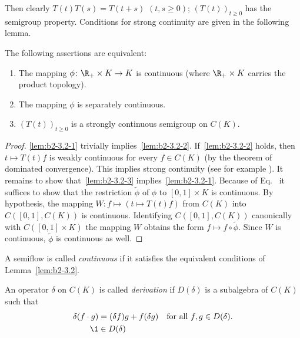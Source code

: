 Then clearly $T(t)T(s) = T(t+s)$ $(t,s\geq 0)$; \ie  $(T(t))_{t \geq 0}$ has the
semigroup property.
Conditions for strong continuity are given in the following lemma.

\begin{lemma}\label{lem:b2-3.2}
The following assertions are equivalent:
\begin{enumerate}[\upshape (a)]
\item \label{lem:b2-3.2-1}
The mapping $\phi \colon \R_{+} \times K \to K$ is continuous (where $\R_{+} \times K$ carries the product topology).
\item \label{lem:b2-3.2-2}
The mapping $\phi$ is separately continuous.
\item \label{lem:b2-3.2-3}
$(T(t))_{t \geq 0}$ is a strongly continuous semigroup on $C(K)$.
\end{enumerate}
\end{lemma}

\begin{proof}
\ref{lem:b2-3.2-1} trivially implies~\ref{lem:b2-3.2-2}.
If~\ref{lem:b2-3.2-2} holds, then $t \mapsto T(t)f$ is weakly continuous for every $f \in C(K)$ (by the theorem of dominated convergence).
This implies strong continuity (see for example \textcite[Proposition 1.23]{davies:1980}).
It remains to show that~\ref{lem:b2-3.2-3} implies~\ref{lem:b2-3.2-1}.
Because of Eq.~ it suffices to show that the restriction $\widetilde{\phi}$ of\/ $\phi$ to $[0,1] \times K$ is continuous.
By hypothesis, the mapping $W \colon f \mapsto (t \mapsto T(t)f)$ from $C(K)$ into $C([0,1],C(K))$ is continuous.
Identifying $C([0,1],C(K))$ canonically with $C([0,1] \times K)$ the mapping $W$ obtains the form $f \mapsto f \circ \widetilde{\phi}$.
Since $W$ is continuous, $\widetilde{\phi}$ is continuous as well.
\end{proof}

A semiflow is called \emph{continuous} if it satisfies the equivalent conditions of Lemma~\ref{lem:b2-3.2}.

\begin{definition}\label{def:b2-3.3}
An operator $\delta$ on $C(K)$ is called \emph{derivation} if\/ $D(\delta)$ is a subalgebra of\/ $C(K)$ such that
\begin{align}
\delta(f \cdot g) &= (\delta f)g + f(\delta g) \quad \text{for all } f,g \in D(\delta). \label{eq:b2-3.4} \\
\1 &\in D(\delta) \label{eq:b2-3.5}
\end{align}
\end{definition}

